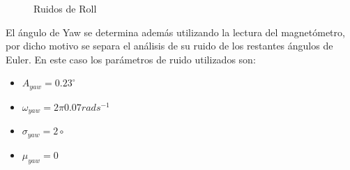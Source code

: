 \documentclass[main]{subfiles}
\begin{document}
\begin{figure}[h!]
  \centering
  \caption{Ruidos de Roll}
  \label{fig:ruidos_roll}
\end{figure}
  
El \'angulo de Yaw se determina adem\'as utilizando la lectura del magnet\'ometro, por dicho motivo se separa el an\'alisis de su ruido de los restantes \'angulos de Euler. En este caso los par\'ametros de ruido utilizados son:

\begin{itemize}
\item $A_{yaw} = 0.23^\circ$
\item $\omega_{yaw} = 2\pi 0.07 rad s^{-1}$
\item $\sigma_{yaw} = 2\circ$
\item $\mu_{yaw} = 0$
\end{itemize}
\end{document}
